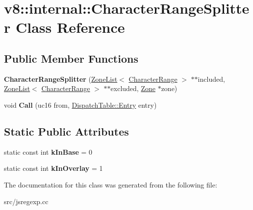 \hypertarget{classv8_1_1internal_1_1_character_range_splitter}{}\section{v8\+:\+:internal\+:\+:Character\+Range\+Splitter Class Reference}
\label{classv8_1_1internal_1_1_character_range_splitter}
\subsection*{Public Member Functions}
\begin{DoxyCompactItemize}
\item 
\hypertarget{classv8_1_1internal_1_1_character_range_splitter_a468e04f06e609af91a96576e373ab079}{}{\bfseries Character\+Range\+Splitter} (\hyperlink{classv8_1_1internal_1_1_zone_list}{Zone\+List}$<$ \hyperlink{classv8_1_1internal_1_1_character_range}{Character\+Range} $>$ $\ast$$\ast$included, \hyperlink{classv8_1_1internal_1_1_zone_list}{Zone\+List}$<$ \hyperlink{classv8_1_1internal_1_1_character_range}{Character\+Range} $>$ $\ast$$\ast$excluded, \hyperlink{classv8_1_1internal_1_1_zone}{Zone} $\ast$zone)\label{classv8_1_1internal_1_1_character_range_splitter_a468e04f06e609af91a96576e373ab079}

\item 
\hypertarget{classv8_1_1internal_1_1_character_range_splitter_a0517acfb32798acf1ac80583b0e47a19}{}void {\bfseries Call} (uc16 from, \hyperlink{classv8_1_1internal_1_1_dispatch_table_1_1_entry}{Dispatch\+Table\+::\+Entry} entry)\label{classv8_1_1internal_1_1_character_range_splitter_a0517acfb32798acf1ac80583b0e47a19}

\end{DoxyCompactItemize}
\subsection*{Static Public Attributes}
\begin{DoxyCompactItemize}
\item 
\hypertarget{classv8_1_1internal_1_1_character_range_splitter_acafe6c6125f72d6171464d9dca464b9b}{}static const int {\bfseries k\+In\+Base} = 0\label{classv8_1_1internal_1_1_character_range_splitter_acafe6c6125f72d6171464d9dca464b9b}

\item 
\hypertarget{classv8_1_1internal_1_1_character_range_splitter_ad3c6c0468b47947ffe046dc2dcf4300d}{}static const int {\bfseries k\+In\+Overlay} = 1\label{classv8_1_1internal_1_1_character_range_splitter_ad3c6c0468b47947ffe046dc2dcf4300d}

\end{DoxyCompactItemize}


The documentation for this class was generated from the following file\+:\begin{DoxyCompactItemize}
\item 
src/jsregexp.\+cc\end{DoxyCompactItemize}
